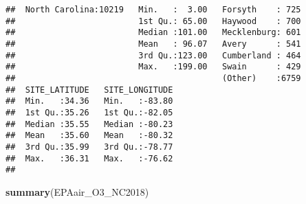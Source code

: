 \documentclass[]{article}
\newenvironment{Shaded}{\begin{snugshade}}{\end{snugshade}}
\newcommand{\KeywordTok}[1]{\textcolor[rgb]{0.13,0.29,0.53}{\textbf{#1}}}
\newcommand{\NormalTok}[1]{#1}
\begin{document}
\begin{verbatim}
##  North Carolina:10219   Min.   :  3.00   Forsyth    : 725  
##                         1st Qu.: 65.00   Haywood    : 700  
##                         Median :101.00   Mecklenburg: 601  
##                         Mean   : 96.07   Avery      : 541  
##                         3rd Qu.:123.00   Cumberland : 464  
##                         Max.   :199.00   Swain      : 429  
##                                          (Other)    :6759  
##  SITE_LATITUDE   SITE_LONGITUDE  
##  Min.   :34.36   Min.   :-83.80  
##  1st Qu.:35.26   1st Qu.:-82.05  
##  Median :35.55   Median :-80.23  
##  Mean   :35.60   Mean   :-80.32  
##  3rd Qu.:35.99   3rd Qu.:-78.77  
##  Max.   :36.31   Max.   :-76.62  
## 
\end{verbatim}

\begin{Shaded}
\begin{Highlighting}[]
\KeywordTok{summary}\NormalTok{(EPAair_O3_NC2018)}
\end{Highlighting}
\end{Shaded}
\end{document}
